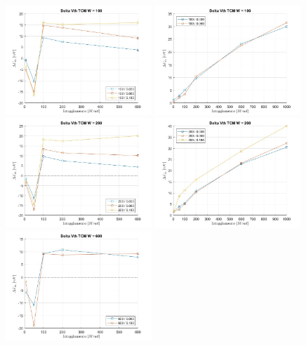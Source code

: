 \documentclass[12pt, letterpaper]{book}
\begin{document}
\begin{figure}[H]
  \centering
  \includegraphics[width=0.49\textwidth]{sovrapposizione-deltaVth-TCM-N100}
  \includegraphics[width=0.49\textwidth]{sovrapposizione-deltaVth-TCM-P100}
  \includegraphics[width=0.49\textwidth]{sovrapposizione-deltaVth-TCM-N200}
  \includegraphics[width=0.49\textwidth]{sovrapposizione-deltaVth-TCM-P200}
  \includegraphics[width=0.49\textwidth]{sovrapposizione-deltaVth-TCM-N600}

\end{figure}
\end{document}
